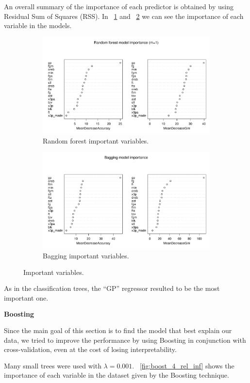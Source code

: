 An overall summary of the importance of each predictor is obtained by using Residual Sum of Squares (RSS). In \Fig~\ref{fig:best_for_500_var_imp_plot} and \Fig~\ref{fig:bagg_500_var_imp_plot} we can see the importance of each variable in the models.

\begin{figure}[H]
	\centering
	\begin{subfigure}{.5\textwidth}
		\centering
		\includegraphics[width=0.5\linewidth]{ImageFiles/Classification/Trees/best_for_500_var_imp_plot}
		\caption{Random forest important variables.}
		\label{fig:best_for_500_var_imp_plot}
	\end{subfigure}%
	\hfill
	\begin{subfigure}{.5\textwidth}
		\centering
		\includegraphics[width=0.5\linewidth]{ImageFiles/Classification/Trees/bagg_500_var_imp_plot}
		\caption{Bagging important variables.}
		\label{fig:bagg_500_var_imp_plot}
	\end{subfigure}
	\caption{Important variables.}
	\label{fig:ImpVar}
\end{figure}

\noindent
As in the classification trees, the ``GP'' regressor resulted to be the most important one.

\vspace{0.2cm}
\noindent
\textbf{Boosting}

Since the main goal of this section is to find the model that best explain our data, we tried to improve the performance by using Boosting in conjunction with cross-validation, even at the cost of losing interpretability. 

Many small trees were used with $\lambda = 0.001$. \Fig~\ref{fig:boost_4_rel_inf} shows the importance of each variable in the dataset given by the Boosting technique.

